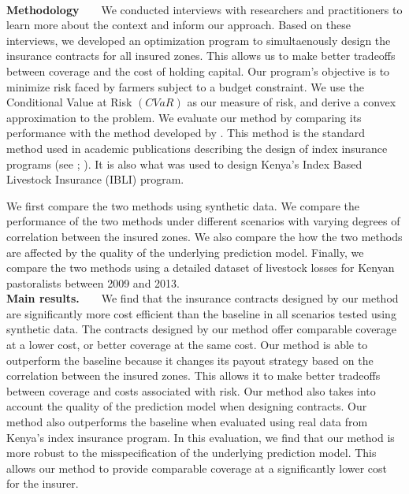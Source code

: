 \documentclass[12pt]{article}
\begin{document}
{\noindent
\\\textbf{Methodology}\ \ \ \
We conducted interviews with researchers and practitioners to learn more about the context and inform our approach. Based on these interviews, we developed an optimization program to simultaenously design the insurance contracts for all insured zones. This allows us to make better tradeoffs between coverage and the cost of holding capital. Our program's objective is to minimize risk faced by farmers subject to a budget constraint. We use the Conditional Value at Risk $(CVaR)$ as our measure of risk, and derive a convex approximation to the problem. We evaluate our method by comparing its performance with the method developed by \cite{chantarat2013designing}. This method is the standard method used in academic publications describing the design of index insurance programs (see \cite{flatnes2018improving}; \cite{jensen2019does}). It is also what was used to design Kenya's Index Based Livestock Insurance (IBLI) program. 

We first compare the two methods using synthetic data. We compare the performance of the two methods under different scenarios with varying degrees of correlation between the insured zones. We also compare the how the two methods are affected by the quality of the underlying prediction model. Finally, we compare the two methods using a detailed dataset of livestock losses for Kenyan pastoralists between 2009 and 2013. 
\noindent
\\\textbf{Main results.}\ \ \ \
We find that the insurance contracts designed by our method are significantly more cost efficient than the baseline in all scenarios tested using synthetic data. The contracts designed by our method offer comparable coverage at a lower cost, or better coverage at the same cost. Our method is able to outperform the baseline because it changes its payout strategy based on the correlation between the insured zones. This allows it to make better tradeoffs between coverage and costs associated with risk. Our method also takes into account the quality of the prediction model when designing contracts. Our method also outperforms the baseline when evaluated using real data from Kenya's index insurance program. In this evaluation, we find that our method is more robust to the misspecification of the underlying prediction model. This allows our method to provide comparable coverage at a significantly lower cost for the insurer. 


}
\end{document}
